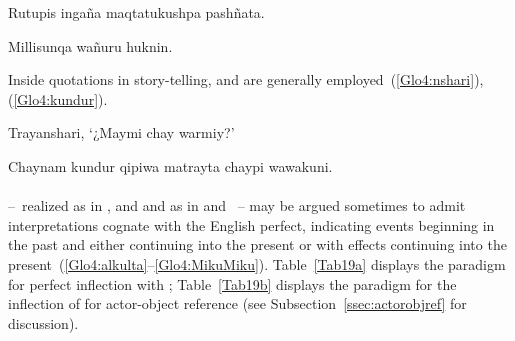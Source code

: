 %
{Rutupis ingaña maqtatukushpa pashñata.}%
{}%
{}{}%

%
{Millisunqa wañuru huknin.}%
{}%
{}{}%

\noindent
Inside quotations in story-telling,  and  are generally employed~(\ref{Glo4:nshari}), (\ref{Glo4:kundur}).

%
{Trayanshari, ‘¿Maymi chay warmiy?’}%
{}%
{}{}%

%
{Chaynam kundur qipiwa matrayta chaypi wawakuni.}%
{}%
{}{}%

\paragraph{}\label{par:perfect}
 --~realized as  in \ACH, \AMV{} and \SP{} and as  in \CH{} and \LT~-- may be argued sometimes to admit interpretations cognate with the English perfect, indicating events beginning in the past and either continuing into the present or with effects continuing into the present~(\ref{Glo4:alkulta}--\ref{Glo4:MikuMiku}). Table~\ref{Tab19a} displays the paradigm for perfect inflection with ; Table~\ref{Tab19b} displays the paradigm for the inflection of  for actor-object reference (see Subsection~\ref{ssec:actorobjref} for discussion).

